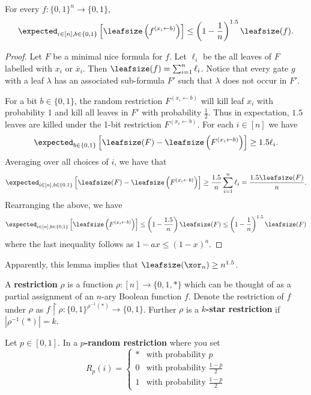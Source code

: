 \begin{lemma}
	\label{lem:onebitrestrictionbd}
	For every $f: \{0,1\}^n \rightarrow \{0,1\}$,
	\[\expected_{i \in [n], b\in \{0,1\}}\left[\leafsize\left(f^{(x_i \leftarrow b)}\right)\right] \leq \left(1 - \frac{1}{n}\right)^{1.5} \leafsize(f).\]
\end{lemma}
\begin{proof}
	Let $F$ be a minimal nice formula for $f$. Let $\ell_i$ be the all leaves of $F$ labelled with $x_i$ or $\bar{x}_i$. Then $\leafsize(f) = \sum_{i = 1}^{n} \ell_i$.  Notice that every gate $g$ with a leaf $\lambda$ has an associated sub-formula $F'$ such that $\lambda$ does not occur in $F'$.
	
	For a bit $b \in \{0,1\}$, the random restriction $F^{(x_i \leftarrow b)}$ will kill leaf $x_i$ with probability $1$ and kill all leaves in $F'$ with probability $\frac{1}{2}$. Thus in expectation, $1.5$ leaves are killed under the 1-bit restriction $F^{(x_i \leftarrow b)}$. For each $i \in [n]$ we have
	\[\expected_{b \in \{0,1\}}\left[\leafsize(F) - \leafsize\left(F^{(x_i \leftarrow b)}\right)\right] \geq 1.5 \ell_i.\] 
	Averaging over all choices of $i$, we have that 
	\[\expected_{i \in [n], b \in \{0,1\}}\left[\leafsize(F) - \leafsize\left(F^{(x_i \leftarrow b)}\right)\right] \geq \frac{1.5}{n}\sum_{i = 1}^{n} \ell_i = \frac{1.5\leafsize(F)}{n}.\]
	Rearranging the above, we have
	\[\expected_{i \in [n], b \in \{0,1\}}\left[\leafsize\left(F^{(x_i \leftarrow b)}\right)\right] \leq \left(1 - \frac{1.5}{n}\right)\leafsize(F) \leq \left(1 - \frac{1}{n}\right)^{1.5} \leafsize(F)\]
	where the last inequality follows as $1 - ax \leq (1 - x)^a$.
\end{proof}
Apparently, this lemma implies that $\leafsize(\xor_n) \geq n^{1.5}$.

\begin{definition}
	\label{def:restrictions}
	A \textbf{restriction} $\rho$ is a function $\rho: [n] \rightarrow \{0,1,*\}$ which can be thought of as a partial assignment of an $n$-ary Boolean function $f$. Denote the restriction of $f$ under $\rho$ as $f \upharpoonright \rho: \{0,1\}^{\rho^{-1}(*)} \rightarrow \{0,1\}$. Further $\rho$ is a \textbf{$k$-star restriction} if $|\rho^{-1}(*)| = k$. 
		
	Let $p\in [0,1]$. In a \textbf{$p$-random restriction} where you set
	\[R_p(i) = \begin{cases}
	*&\mbox{with probability } p\\
	0&\mbox{with probability } \frac{1-p}{2}\\
	1&\mbox{with probability } \frac{1-p}{2}
	\end{cases}\]
\end{definition}

